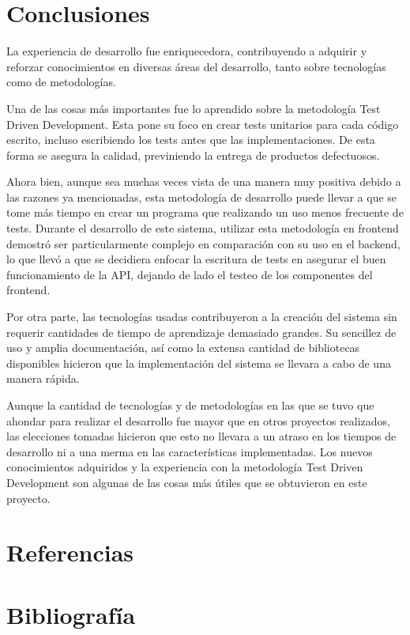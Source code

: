\documentclass{article}
\begin{document}
\section{Conclusiones}
La experiencia de desarrollo fue enriquecedora, contribuyendo a adquirir y reforzar conocimientos en diversas áreas del desarrollo, tanto sobre tecnologías como de metodologías.

Una de las cosas más importantes fue lo aprendido sobre la metodología Test Driven Development. Esta pone su foco en crear tests unitarios para cada código escrito, incluso escribiendo los tests antes que las implementaciones. De esta forma se asegura la calidad, previniendo la entrega de productos defectuosos.

Ahora bien, aunque sea muchas veces vista de una manera muy positiva debido a las razones ya mencionadas, esta metodología de desarrollo puede llevar a que se tome más tiempo en crear un programa que realizando un uso menos frecuente de tests. Durante el desarrollo de este sistema, utilizar esta metodología en frontend demostró ser particularmente complejo en comparación con su uso en el backend, lo que llevó a que se decidiera enfocar la escritura de tests en asegurar el buen funcionamiento de la API, dejando de lado el testeo de los componentes del frontend.

Por otra parte, las tecnologías usadas contribuyeron a la creación del sistema sin requerir cantidades de tiempo de aprendizaje demasiado grandes. Su sencillez de uso y amplia documentación, así como la extensa cantidad de bibliotecas disponibles hicieron que la implementación del sistema se llevara a cabo de una manera rápida.

Aunque la cantidad de tecnologías y de metodologías en las que se tuvo que ahondar para realizar el desarrollo fue mayor que en otros proyectos realizados, las elecciones tomadas hicieron que esto no llevara a un atraso en los tiempos de desarrollo ni a una merma en las características implementadas. Los nuevos conocimientos adquiridos y la experiencia con la metodología Test Driven Development son algunas de las cosas más útiles que se obtuvieron en este proyecto.
\newpage
\section{Referencias}
\begin{sloppypar}
\printbibliography[heading=none,category=cited]
\end{sloppypar}
\newpage
\section{Bibliografía}
\printbibliography[heading=none,notcategory=cited]
\newpage
\end{document}
